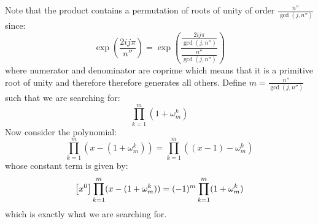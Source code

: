 \begin{solution}
\begin{enumerate}[label=(\alph*)]
\[        \]
        Note that the product contains a permutation of roots of unity of order $\frac{n''}{\gcd(j,n'')}$  since:
        \[
            \exp\left(\frac{2ij\pi}{n''}\right) = \exp\left(\frac{\frac{2ij\pi}{\gcd(j,n'')}}{\frac{n''}{\gcd(j,n'')}}\right)
        \]
        where numerator and denominator are coprime which means that it is a primitive root of unity and therefore therefore generates all others. Define $m= \frac{n''}{\gcd(j,n'')}$ such that we are searching for:
        \[
            \prod_{k=1}^m (1 + \omega_m^k)
        \]
        Now consider the polynomial:
        \[
            \prod_{k=1}^{m} (x-(1+\omega_m^k)) = \prod_{k=1}^{m} ((x-1)-\omega_m^k)
        \]
        whose constant term is given by:
        \[
            \left[x^0\right]\prod_{k=1}^{m} (x-(1+\omega_m^k)) = (-1)^m \prod_{k=1}^{m}(1+\omega_m^k)
        \]
        which is exactly what we are searching for.


\end{enumerate}
\end{solution}
